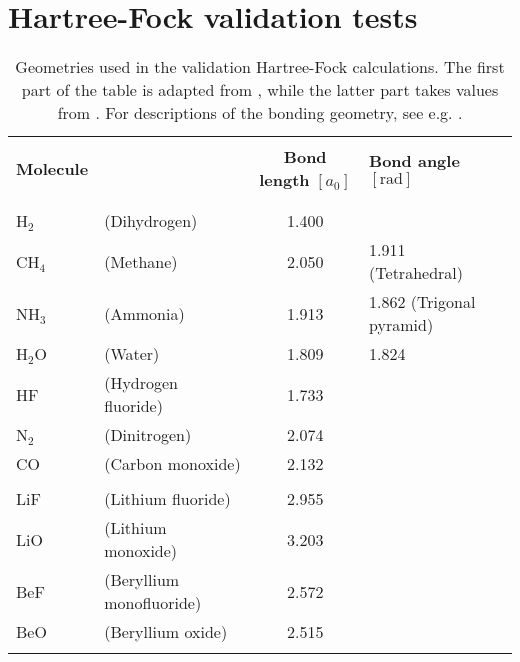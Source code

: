 \documentclass[../../master.tex]{subfiles}
\begin{document}
\renewcommand{\R}{{\bf R}}
\renewcommand{\r}{{\bf r}}
\newcommand{\p}{{\bf p}}
\newcommand{\q}{{\bf q}}
\renewcommand{\H}{\mathcal{H}}
\newcommand{\psit}{\left|\psi(t)\right\rangle}


\chapter{Hartree-Fock validation tests}

\begin{table}
\setlength\extrarowheight{2pt}
\begin{tabularx}{\textwidth}{l X c l}
\hline
\hline
\\[-0.9em]
\textbf{Molecule} & & \textbf{Bond length} $[a_0]$ & \textbf{Bond angle} $[\text{rad}]$ \\
\\[-0.9em]
\hline
\\[-0.9em]
H${}_2$ & (Dihydrogen)   & 1.400 & \\
CH${}_4$ &(Methane)      & 2.050 & 1.911 (Tetrahedral)       \\
NH${}_3$ &(Ammonia)      & 1.913 & 1.862 (Trigonal pyramid)  \\
H${}_2$O &(Water)        & 1.809 & 1.824                     \\
HF &(Hydrogen fluoride)  & 1.733 & \\
N${}_2$ &(Dinitrogen)    & 2.074 & \\
CO &(Carbon monoxide)    & 2.132 & \\
\\[-0.0em]
LiF & (Lithium fluoride) & 2.955 & \\ %
LiO & (Lithium monoxide) & 3.203 & \\ %
BeF & (Beryllium monofluoride) & 2.572 & \\ %
BeO & (Beryllium oxide) & 2.515 & \\ %
\\[-0.9em]
\hline
\end{tabularx}
\caption{Geometries used in the validation Hartree-Fock calculations. The first part of the table is adapted from \cite{szabo}, while the latter part takes values from \cite{langhoff}. For descriptions of the bonding geometry, see e.g. \cite{zumdahl}. \label{tab:hfv1}}
\end{table}
\end{document}

